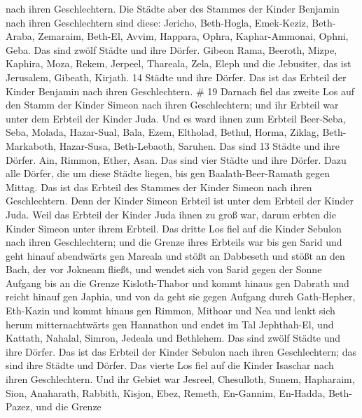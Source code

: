 nach ihren Geschlechtern.  Die Städte aber des Stammes der
Kinder Benjamin nach ihren Geschlechtern sind diese: Jericho,
Beth-Hogla, Emek-Keziz,  Beth-Araba, Zemaraim, Beth-El,
 Avvim, Happara, Ophra,  Kaphar-Ammonai,
Ophni, Geba. Das sind zwölf Städte und ihre Dörfer.  Gibeon
Rama, Beeroth,  Mizpe, Kaphira, Moza,  Rekem,
Jerpeel, Thareala,  Zela, Eleph und die Jebusiter, das ist
Jerusalem, Gibeath, Kirjath. 14 Städte und ihre Dörfer. Das ist das
Erbteil der Kinder Benjamin nach ihren Geschlechtern. \# 19 
Darnach fiel das zweite Los auf den Stamm der Kinder Simeon nach ihren
Geschlechtern; und ihr Erbteil war unter dem Erbteil der Kinder Juda.
 Und es ward ihnen zum Erbteil Beer-Seba, Seba, Molada,
 Hazar-Sual, Bala, Ezem,  Eltholad, Bethul,
Horma,  Ziklag, Beth-Markaboth, Hazar-Susa, 
Beth-Lebaoth, Saruhen. Das sind 13 Städte und ihre Dörfer. 
Ain, Rimmon, Ether, Asan. Das sind vier Städte und ihre Dörfer.
 Dazu alle Dörfer, die um diese Städte liegen, bis gen
Baalath-Beer-Ramath gegen Mittag. Das ist das Erbteil des Stammes der
Kinder Simeon nach ihren Geschlechtern.  Denn der Kinder
Simeon Erbteil ist unter dem Erbteil der Kinder Juda. Weil das Erbteil
der Kinder Juda ihnen zu groß war, darum erbten die Kinder Simeon unter
ihrem Erbteil.  Das dritte Los fiel auf die Kinder Sebulon
nach ihren Geschlechtern; und die Grenze ihres Erbteils war bis gen
Sarid  und geht hinauf abendwärts gen Mareala und stößt an
Dabbeseth und stößt an den Bach, der vor Jokneam fließt, 
und wendet sich von Sarid gegen der Sonne Aufgang bis an die Grenze
Kisloth-Thabor und kommt hinaus gen Dabrath und reicht hinauf gen
Japhia,  und von da geht sie gegen Aufgang durch
Gath-Hepher, Eth-Kazin und kommt hinaus gen Rimmon, Mithoar und Nea
 und lenkt sich herum mitternachtwärts gen Hannathon und
endet im Tal Jephthah-El,  und Kattath, Nahalal, Simron,
Jedeala und Bethlehem. Das sind zwölf Städte und ihre Dörfer.
 Das ist das Erbteil der Kinder Sebulon nach ihren
Geschlechtern; das sind ihre Städte und Dörfer.  Das vierte
Los fiel auf die Kinder Isaschar nach ihren Geschlechtern. 
Und ihr Gebiet war Jesreel, Chesulloth, Sunem,  Hapharaim,
Sion, Anaharath,  Rabbith, Kisjon, Ebez, 
Remeth, En-Gannim, En-Hadda, Beth-Pazez,  und die Grenze
